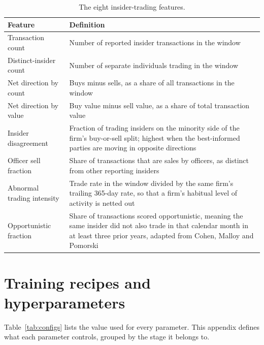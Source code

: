 \documentclass[logo,msc,ai]{infthesis}        %
\begin{document}
\begin{table}[h]
\footnotesize
\caption{The eight insider-trading features.}
\label{tab:insiderfeatures}
\begin{tabularx}{\textwidth}{@{}L{4.0cm}X@{}}
\toprule
\textbf{Feature} & \textbf{Definition} \\
\midrule
Transaction count & Number of reported insider transactions in the window \\
\addlinespace
Distinct-insider count & Number of separate individuals trading in the window \\
\addlinespace
Net direction by count & Buys minus sells, as a share of all transactions in the window \\
\addlinespace
Net direction by value & Buy value minus sell value, as a share of total transaction value \\
\addlinespace
Insider disagreement & Fraction of trading insiders on the minority side of the firm's buy-or-sell split; highest when the best-informed parties are moving in opposite directions \\
\addlinespace
Officer sell fraction & Share of transactions that are sales by officers, as distinct from other reporting insiders \\
\addlinespace
Abnormal trading intensity & Trade rate in the window divided by the same firm's trailing 365-day rate, so that a firm's habitual level of activity is netted out \\
\addlinespace
Opportunistic fraction & Share of transactions scored opportunistic, meaning the same insider did not also trade in that calendar month in at least three prior years, adapted from Cohen, Malloy and Pomorski \cite{cohen2012decoding} \\
\bottomrule
\end{tabularx}
\end{table}

\chapter{Training recipes and hyperparameters}
\label{app:recipes}
Table~\ref{tab:configs} lists the value used for every parameter. This appendix defines what each parameter controls, grouped by the stage it belongs to.
\end{document}

